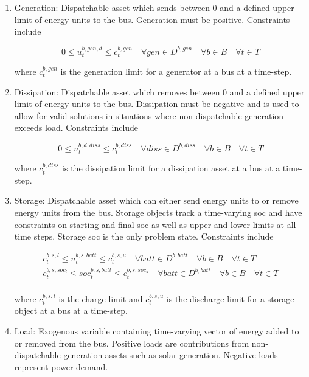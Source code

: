 \documentclass[12pt]{article}
\begin{document}
\begin{enumerate}
	\item Generation: Dispatchable asset which sends between 0 and a defined upper limit of energy units to the bus. Generation must be positive. Constraints include
	
	\begin{equation}
		0 \leq u^{b,gen,d}_t \leq c^{b,gen}_t \quad\forall gen\in D^{b,gen}\quad\forall b\in B\quad\forall t\in T
	\end{equation}
	
	where $c^{b,gen}_t$ is the generation limit for a generator at a bus at a time-step.
	
	\item Dissipation: Dispatchable asset which removes between 0 and a defined upper limit of energy units to the bus. Dissipation must be negative and is used to allow for valid solutions in situations where non-dispatchable generation exceeds load. Constraints include
	
	\begin{equation}
		0 \leq u^{b,d,diss}_t \leq c^{b,diss}_t \quad\forall diss\in D^{b,diss}\quad\forall b\in B\quad\forall t\in T
	\end{equation}
	
	where $c^{b,diss}_t$ is the dissipation limit for a dissipation asset at a bus at a time-step.
	
	\item Storage: Dispatchable asset which can either send energy units to or remove energy units from the bus. Storage objects track a time-varying \gls{soc} and have constraints on starting and final \gls{soc} as well as upper and lower limits at all time steps. Storage \gls{soc} is the only problem state. Constraints include
	
	\begin{gather}
		c^{b,s,l}_t \leq u^{b,s,batt}_t \leq c^{b,s,u}_t \quad\forall batt\in D^{b,batt}\quad\forall b\in B\quad\forall t\in T\\
		c^{b,s,soc_l}_t \leq soc^{b,s,batt}_t \leq c^{b,s,soc_u}_t \quad\forall batt\in D^{b,batt}\quad\forall b\in B\quad\forall t\in T\\
		
	\end{gather}
	
	where $c^{b,s,l}_t$ is the charge limit and $c^{b,s,u}_t$ is the discharge limit for a storage object at a bus at a time-step.
	
	\item Load: Exogenous variable containing time-varying vector of energy added to or removed from the bus. Positive loads are contributions from non-dispatchable generation assets such as solar generation. Negative loads represent power demand.
\end{enumerate}
\end{document}
